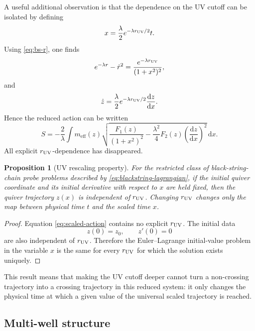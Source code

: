 \documentclass[11pt,a4paper]{article}
\theoremstyle{plain}
\newtheorem{proposition}{Proposition}[section]
\theoremstyle{definition}
\theoremstyle{remark}
\newcommand{\meff}{m_{\mathrm{eff}}}
\begin{document}
A useful additional observation is that the dependence on the UV cutoff can be isolated by defining
\begin{equation*}
x
=
\frac{\lambda}{2}
e^{-\lambda r_{\rm UV}/2}t.
\end{equation*}
Using \eqref{eq:bs-r}, one finds
\begin{equation*}
e^{-\lambda r}-\dot r^2
=
\frac{
e^{-\lambda r_{\rm UV}}
}{
(1+x^2)^2
},
\end{equation*}
and
\begin{equation*}
\dot z
=
\frac{\lambda}{2}
e^{-\lambda r_{\rm UV}/2}
\frac{\mathrm d z}{\mathrm d x}.
\end{equation*}
Hence the reduced action can be written
\begin{equation}
S
=
-\frac2\lambda
\int
\meff(z)
\sqrt{
\frac{F_1(z)}{(1+x^2)^2}
-
\frac{\lambda^2}{4}
F_2(z)
\left(\frac{\mathrm d z}{\mathrm d x}\right)^2
}
\,\mathrm d x.
\label{eq:scaled-action}
\end{equation}
All explicit $r_{\rm UV}$-dependence has disappeared.

\begin{proposition}[UV rescaling property]
\label{prop:uv-rescaling}
For the restricted class of black-string-chain probe problems described by \eqref{eq:blackstring-lagrangian}, if the initial quiver coordinate and its initial derivative with respect to $x$ are held fixed, then the quiver trajectory $z(x)$ is independent of $r_{\rm UV}$. Changing $r_{\rm UV}$ changes only the map between physical time $t$ and the scaled time $x$.
\end{proposition}

\begin{proof}
Equation \eqref{eq:scaled-action} contains no explicit $r_{\rm UV}$. The initial data
\begin{equation*}
z(0)=z_0,
\qquad
z'(0)=0
\end{equation*}
are also independent of $r_{\rm UV}$. Therefore the Euler--Lagrange initial-value problem in the variable $x$ is the same for every $r_{\rm UV}$ for which the solution exists uniquely.
\end{proof}

This result means that making the UV cutoff deeper cannot turn a non-crossing trajectory into a crossing trajectory in this reduced system: it only changes the physical time at which a given value of the universal scaled trajectory is reached.

\subsection{Multi-well structure}
\end{document}
